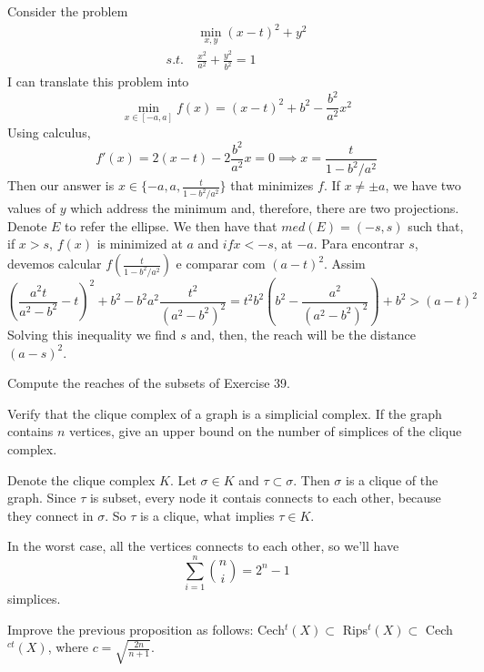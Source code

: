 \begin{enumerate}
    Consider the problem
    \begin{align*}
        &\min_{x,y} (x - t)^2 + y^2 \\
        s.t. ~& \frac{x^2}{a^2} + \frac{y^2}{b^2} = 1
    \end{align*}
    I can translate this problem into 
    $$
    \min_{x \in [-a,a]} f(x) = (x - t)^2 + b^2 - \frac{b^2}{a^2}x^2
    $$
    Using calculus, 
    $$
    f'(x) = 2(x - t) - 2\frac{b^2}{a^2}x = 0 \implies x = \frac{t}{1 - b^2/a^2}
    $$
    Then our answer is $x \in \{-a, a, \frac{t}{1 - b^2/a^2}\}$ that minimizes
    $f$. If $x \neq \pm a$, we have two values of $y$ which address the
    minimum and, therefore, there are two projections. Denote $E$ to refer the ellipse. We then have that $med(E) =
    (-s,s)$
    such that, if $x > s$, $f(x)$ is minimized at $a$ and $if x < -s$, at
    $-a$. Para encontrar $s$, devemos calcular $f(\frac{t}{1 - b^2/a^2})$ e
    comparar com $(a - t)^2$. Assim 
    $$
    \left(\frac{a^2t}{a^2 - b^2} - t\right)^2 + b^2 - b^2a^2\frac{t^2}{(a^2 - b^2)^2} = t^2b^2\left(b^2 - \frac{a^2}{(a^2 - b^2)^2}\right) + b^2 > (a - t)^2
    $$
    Solving this inequality we find $s$ and, then, the reach will be the
    distance $(a - s)^2$. 


\end{enumerate}

\noindent\linia

\begin{exercise}
    Compute the reaches of the subsets of Exercise 39.
\end{exercise}

\noindent\linia

\begin{exercise}
    Verify that the clique complex of a graph is a simplicial complex. If the
    graph contains $n$ vertices, give an upper bound on the number of
    simplices of the clique complex.
\end{exercise}

Denote the clique complex $K$. Let $\sigma \in K$ and $\tau \subset \sigma$.
Then $\sigma$ is a clique of the graph. Since $\tau$ is subset, every node it
contais connects to each other, because they connect in $\sigma$. So $\tau$ is
a clique, what implies $\tau \in K$.

In the worst case, all the vertices connects to each other, so we'll have 
$$
\sum_{i=1}^n \genfrac(){0pt}{}{n}{i} = 2^n - 1
$$
simplices. 

\noindent\linia

\begin{exercise}
    Improve the previous proposition as follows: Cech$^t(X) \subset $
    Rips$^t(X) \subset $ Cech$^{ct}(X)$, where $c = \sqrt{\frac{2n}{n+1}}$.
\end{exercise}